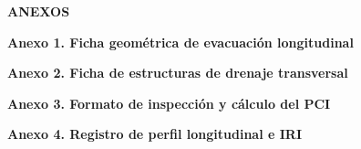 \clearpage
{}
{}
\noindent\textbf{ANEXOS}\par\vspace{10pt}

{}
\noindent\textbf{Anexo 1. Ficha geométrica de evacuación longitudinal}\label{anexo:longitudinal}\par\nobreak\vspace{8pt}
\begin{center}
\begin{minipage}{0.95\linewidth}

\end{minipage}
\end{center}

\clearpage

{}
\noindent\textbf{Anexo 2. Ficha de estructuras de drenaje transversal}\label{anexo:transversal}\par\nobreak\vspace{8pt}
\begin{center}
\begin{minipage}{0.95\linewidth}

\end{minipage}
\end{center}

\clearpage

{}
\noindent\textbf{Anexo 3. Formato de inspección y cálculo del PCI}\label{anexo:pci}\par\nobreak\vspace{8pt}
\begin{center}
\begin{minipage}{0.95\linewidth}

\end{minipage}
\end{center}

\clearpage

{}
\noindent\textbf{Anexo 4. Registro de perfil longitudinal e IRI}\label{anexo:iri}\par\nobreak\vspace{8pt}
\begin{center}
\begin{minipage}{0.95\linewidth}

\end{minipage}
\end{center}
